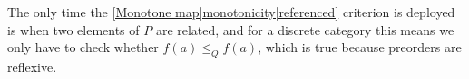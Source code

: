 The only time the \ref{Monotone map|monotonicity|referenced} criterion is deployed is when two elements of $P$ are related, and for a discrete category this means we only have to check whether $f(a) \leq_Q f(a)$, which is true because preorders are reflexive.

